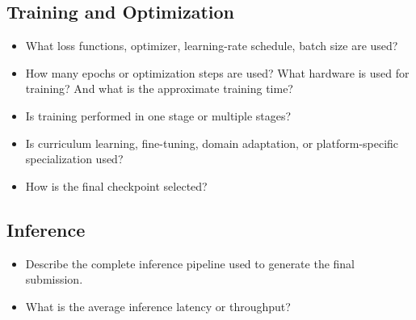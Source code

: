 \documentclass[letterpaper,10pt,conference]{ieeeconf}
\begin{document}
\subsection{Training and Optimization}

\begin{itemize}
    \item What loss functions, optimizer, learning-rate schedule, batch size  are used?
    \item How many epochs or optimization steps are used?  What hardware is used for training? And what is the approximate training time?
    
    \item Is training performed in one stage or multiple stages?
    \item Is curriculum learning, fine-tuning, domain adaptation, or platform-specific specialization used?
    \item How is the final checkpoint selected?
\end{itemize}





\subsection{Inference}

\begin{itemize}
    \item Describe the complete inference pipeline used to generate the final submission.

    \item What is the average inference latency or throughput?
\end{itemize}
\end{document}
